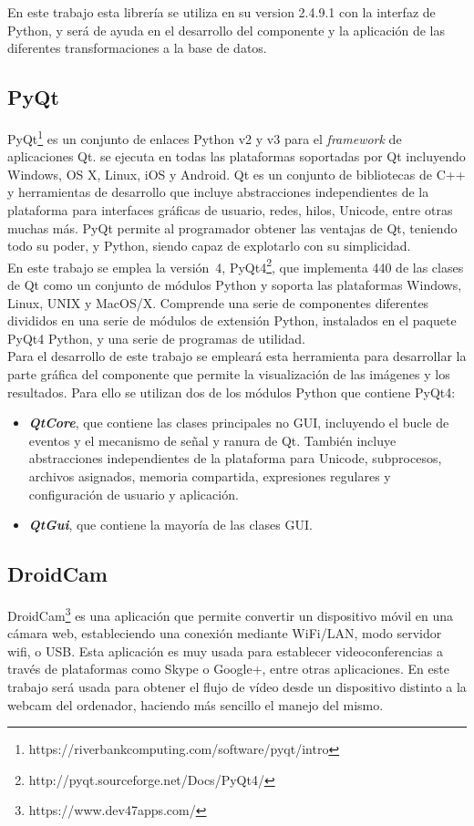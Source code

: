 En este trabajo esta librería se utiliza en su version 2.4.9.1 con la interfaz de Python, y será de ayuda en el desarrollo del componente y la aplicación de las diferentes transformaciones a la base de datos.

\subsection{PyQt}
PyQt\footnote{https://riverbankcomputing.com/software/pyqt/intro} es un conjunto de enlaces Python v2 y v3 para el \textit{framework} de aplicaciones Qt. se ejecuta en todas las plataformas soportadas por Qt incluyendo Windows, OS X, Linux, iOS y Android. Qt es un conjunto de bibliotecas de C++ y herramientas de desarrollo que incluye abstracciones independientes de la plataforma para interfaces gráficas de usuario, redes, hilos, Unicode, entre otras muchas más. PyQt permite al programador obtener las ventajas de Qt, teniendo todo su poder, y Python, siendo capaz de explotarlo con su simplicidad.\\

En este trabajo se emplea la versión~4, PyQt4\footnote{http://pyqt.sourceforge.net/Docs/PyQt4/}, que implementa 440 de las clases de Qt como un conjunto de módulos Python y soporta las plataformas Windows, Linux, UNIX y MacOS/X. Comprende una serie de componentes diferentes divididos en una serie de módulos de extensión Python, instalados en el paquete PyQt4 Python, y una serie de programas de utilidad.\\

Para el desarrollo de este trabajo se empleará esta herramienta para desarrollar la parte gráfica del componente que permite la visualización de las imágenes y los resultados. Para ello se utilizan dos de los módulos Python que contiene PyQt4:

\begin{itemize}
	\item \textbf{\textit{QtCore}}, que contiene las clases principales no GUI, incluyendo el bucle de eventos y el mecanismo de señal y ranura de Qt. También incluye abstracciones independientes de la plataforma para Unicode, subprocesos, archivos asignados, memoria compartida, expresiones regulares y configuración de usuario y aplicación.
	\item \textbf{\textit{QtGui}}, que contiene la mayoría de las clases GUI.
\end{itemize}

\subsection{DroidCam}\label{sec.droid}
DroidCam\footnote{https://www.dev47apps.com/} es una aplicación que permite convertir un dispositivo móvil en una cámara web, estableciendo una conexión mediante WiFi/LAN, modo servidor wifi, o USB. Esta aplicación es muy usada para establecer videoconferencias a través de plataformas como Skype o Google+, entre otras aplicaciones. En este trabajo será usada para obtener el flujo de vídeo desde un dispositivo distinto a la webcam del ordenador, haciendo más sencillo el manejo del mismo.\\

